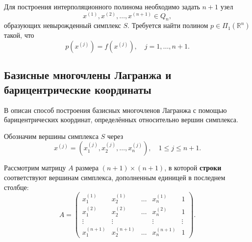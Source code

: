 \documentclass[a4paper,12pt]{article}
\theoremstyle{indented}
\begin{document}
Для построения интерполяционного полинома необходимо задать $n+1$ узел
\[
x^{(1)}, x^{(2)}, \dots, x^{(n+1)} \in Q_n,
\]
образующих невырожденный симплекс $S$. Требуется найти полином $p \in \Pi_1(\mathbb{R}^n)$ такой, что
\[
p(x^{(j)}) = f(x^{(j)}), \quad j = 1, \dots, n+1.
\]

\subsection{Базисные многочлены Лагранжа и барицентрические координаты}

В \cite{nevsky_geo} описан способ построения базисных многочленов Лагранжа с помощью барицентрических координат, определённых относительно вершин симплекса.

Обозначим вершины симплекса $S$ через
\[
x^{(j)} = \left(x_1^{(j)}, x_2^{(j)}, \dots, x_n^{(j)}\right), \quad 1 \le j \le n+1.
\]

Рассмотрим матрицу $A$ размера $(n+1) \times (n+1)$, в которой \textbf{строки} соответствуют вершинам симплекса, дополненным единицей в последнем столбце:
\[
A = \begin{pmatrix}
x_1^{(1)} & x_2^{(1)} & \dots & x_n^{(1)} & 1 \\
x_1^{(2)} & x_2^{(2)} & \dots & x_n^{(2)} & 1 \\
\vdots & \vdots & & \vdots & \vdots \\
x_1^{(n+1)} & x_2^{(n+1)} & \dots & x_n^{(n+1)} & 1
\end{pmatrix}.
\]
\end{document}
